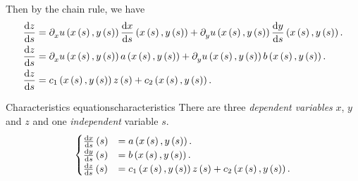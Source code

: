 Then by the chain rule, we have
\begin{align*}
	\diff{z}{s}
	 & =
	\difcp{u}{x}
	\left(
	x\left(s\right),
	y\left(s\right)
	\right)
	\diff{x}{s}
	\left(
	x\left(s\right),
	y\left(s\right)
	\right)+
	\difcp{u}{y}
	\left(
	x\left(s\right),
	y\left(s\right)
	\right)
	\diff{y}{s}
	\left(
	x\left(s\right),
	y\left(s\right)
	\right). \\
	\diff{z}{s}
	 & =
	\difcp{u}{x}
	\left(
	x\left(s\right),
	y\left(s\right)
	\right)
	a
	\left(
	x\left(s\right),
	y\left(s\right)
	\right)+
	\difcp{u}{y}
	\left(
	x\left(s\right),
	y\left(s\right)
	\right)
	b
	\left(
	x\left(s\right),
	y\left(s\right)
	\right). \\
	\diff{z}{s}
	 & =
	c_{1}
	\left(
	x\left(s\right),
	y\left(s\right)
	\right)
	z
	\left(s\right)+
	c_{2}
	\left(
	x\left(s\right),
	y\left(s\right)
	\right).
\end{align*}

\begin{definition}{Characteristics equations}{characteristics}
	There are three \emph{dependent variables} $x$, $y$ and $z$ and
	one \emph{independent} variable $s$.
	\begin{equation*}
		\begin{cases}
			\diff{x}{s}
			\left(s\right) & =
			a
			\left(
			x\left(s\right),
			y\left(s\right)
			\right).           \\
			\diff{y}{s}
			\left(s\right) & =
			b
			\left(
			x\left(s\right),
			y\left(s\right)
			\right).           \\
			\diff{z}{s}
			\left(s\right) & =
			c_{1}
			\left(
			x\left(s\right),
			y\left(s\right)
			\right)
			z
			\left(s\right)+
			c_{2}
			\left(
			x\left(s\right),
			y\left(s\right)
			\right).
		\end{cases}
	\end{equation*}
\end{definition}

